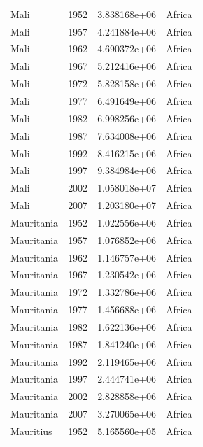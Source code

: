 \documentclass[
  letterpaper,
  DIV=11,
  numbers=noendperiod]{scrreprt}
\begin{document}
\begin{tcolorbox}
\begin{tabular}{lrrl}
Mali                     &  1952 &  3.838168e+06 &    Africa \\
Mali                     &  1957 &  4.241884e+06 &    Africa \\
Mali                     &  1962 &  4.690372e+06 &    Africa \\
Mali                     &  1967 &  5.212416e+06 &    Africa \\
Mali                     &  1972 &  5.828158e+06 &    Africa \\
Mali                     &  1977 &  6.491649e+06 &    Africa \\
Mali                     &  1982 &  6.998256e+06 &    Africa \\
Mali                     &  1987 &  7.634008e+06 &    Africa \\
Mali                     &  1992 &  8.416215e+06 &    Africa \\
Mali                     &  1997 &  9.384984e+06 &    Africa \\
Mali                     &  2002 &  1.058018e+07 &    Africa \\
Mali                     &  2007 &  1.203180e+07 &    Africa \\
Mauritania               &  1952 &  1.022556e+06 &    Africa \\
Mauritania               &  1957 &  1.076852e+06 &    Africa \\
Mauritania               &  1962 &  1.146757e+06 &    Africa \\
Mauritania               &  1967 &  1.230542e+06 &    Africa \\
Mauritania               &  1972 &  1.332786e+06 &    Africa \\
Mauritania               &  1977 &  1.456688e+06 &    Africa \\
Mauritania               &  1982 &  1.622136e+06 &    Africa \\
Mauritania               &  1987 &  1.841240e+06 &    Africa \\
Mauritania               &  1992 &  2.119465e+06 &    Africa \\
Mauritania               &  1997 &  2.444741e+06 &    Africa \\
Mauritania               &  2002 &  2.828858e+06 &    Africa \\
Mauritania               &  2007 &  3.270065e+06 &    Africa \\
Mauritius                &  1952 &  5.165560e+05 &    Africa \\

\end{tabular}
\end{tcolorbox}
\end{document}
